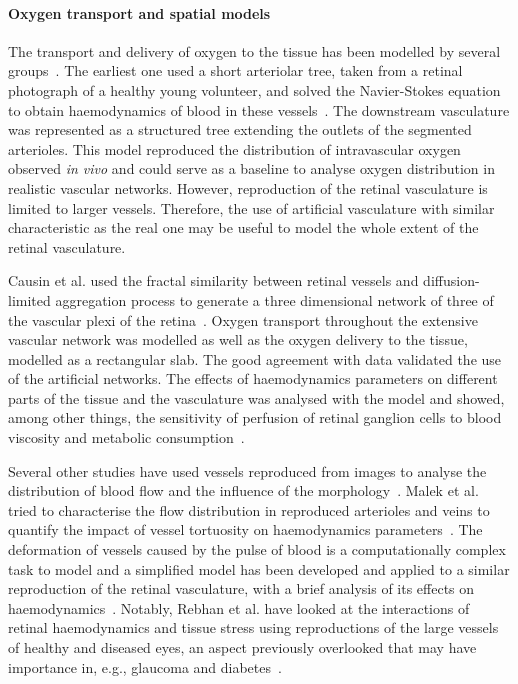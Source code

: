 \documentclass{article}
\begin{document}
\paragraph*{Oxygen transport and spatial models}

The transport and delivery of oxygen to the tissue has been modelled by several groups~\cite{Aquah_et_al_2021,Causin_2015,Liu_2009}.
The earliest one used a short arteriolar tree, taken from a retinal photograph of a healthy young volunteer, and solved the Navier-Stokes equation to obtain haemodynamics of blood in these vessels~\cite{Liu_2009}.
The downstream vasculature was represented as a structured tree extending the outlets of the segmented arterioles.
This model reproduced the distribution of intravascular oxygen observed \textit{in vivo} and could serve as a baseline to analyse oxygen distribution in realistic vascular networks.
However, reproduction of the retinal vasculature is limited to larger vessels.
Therefore, the use of artificial vasculature with similar characteristic as the real one may be useful to model the whole extent of the retinal vasculature.

Causin et al. used the fractal similarity between retinal vessels and diffusion-limited aggregation process to generate a three dimensional network of three of the vascular plexi of the retina~\cite{Causin_2015}.
Oxygen transport throughout the extensive vascular network was modelled as well as the oxygen delivery to the tissue, modelled as a rectangular slab.
The good agreement with data validated the use of the artificial networks.
The effects of haemodynamics parameters on different parts of the tissue and the vasculature was analysed with the model and showed, among other things, the sensitivity of perfusion of retinal ganglion cells to blood viscosity and metabolic consumption~\cite{Causin_2015}.


Several other studies have used vessels reproduced from images to analyse the distribution of blood flow and the influence of the morphology~\cite{Malek_2014,Malek_2015,Rebhan_2019}.
Malek et al. tried to characterise the flow distribution in reproduced arterioles and veins to quantify the impact of vessel tortuosity on haemodynamics parameters~\cite{Malek_2014,Malek_2015}.
The deformation of vessels caused by the pulse of blood is a computationally complex task to model and a simplified model has been developed and applied to a similar reproduction of the retinal vasculature, with a brief analysis of its effects on haemodynamics~\cite{Aletti_2016}.
Notably, Rebhan et al. have looked at the interactions of retinal haemodynamics and tissue stress using reproductions of the large vessels of healthy and diseased eyes, an aspect previously overlooked that may have importance in, e.g., glaucoma and diabetes~\cite{Rebhan_2019}.
\end{document}
